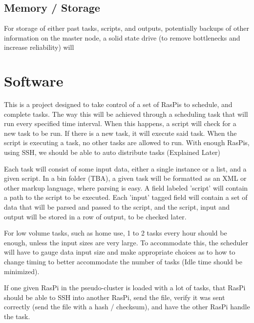 \documentclass{report}
\begin{document}
\subsection{Memory / Storage}

For storage of either past tasks, scripts, and outputs, potentially backups of other information on the master node, a solid state drive (to remove bottlenecks and increase reliability) will

\begin{figure}[ht!]
\end{figure}


\section{Software}

This is a project designed to take control of a set of RasPis to schedule, and complete tasks. The way this will be achieved through a scheduling task that will run every specified time interval. When this happens, a script will check for a new task to be run. If there is a new task, it will execute said task. When the script is executing a task, no other tasks are allowed to run. With enough RasPis, using SSH, we should be able to auto distribute tasks (Explained Later)

Each task will consist of some input data, either a single instance or a list, and a given script. In a bin folder (TBA), a given task will be formatted as an XML or other markup language, where parsing is easy. A field labeled 'script' will contain a path to the script to be executed. Each 'input' tagged field will contain a set of data that will be parsed and passed to the script, and the script, input and output will be stored in a row of output, to be checked later.

For low volume tasks, such as home use, 1 to 2 tasks every hour should be enough, unless the input sizes are very large. To accommodate this, the scheduler will have to gauge data input size and make appropriate choices as to how to change timing to better accommodate the number of tasks (Idle time should be minimized).

If one given RasPi in the pseudo-cluster is loaded with a lot of tasks, that RasPi should be able to SSH into another RasPi, send the file, verify it was sent correctly (send the file with a hash / checksum), and have the other RasPi handle the task.
\end{document}
